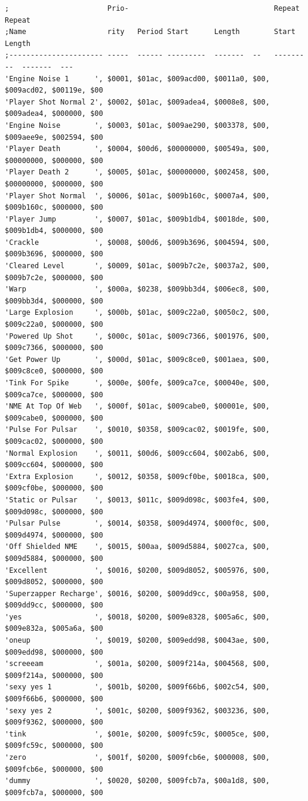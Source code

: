 \begin{lstlisting}[basicstyle=\scriptsize\ttfamily,caption=The contents of \icode{samtab} at \icode{\$9AC800}.]
;                       Prio-                                  Repeat     Repeat
;Name                   rity   Period Start      Length        Start      Length      
;---------------------- -----  ------ ---------  -------  --   ---------  -------  ---
'Engine Noise 1      ', $0001, $01ac, $009acd00, $0011a0, $00, $009acd02, $00119e, $00
'Player Shot Normal 2', $0002, $01ac, $009adea4, $0008e8, $00, $009adea4, $000000, $00
'Engine Noise        ', $0003, $01ac, $009ae290, $003378, $00, $009aee9e, $002594, $00
'Player Death        ', $0004, $00d6, $00000000, $00549a, $00, $00000000, $000000, $00
'Player Death 2      ', $0005, $01ac, $00000000, $002458, $00, $00000000, $000000, $00
'Player Shot Normal  ', $0006, $01ac, $009b160c, $0007a4, $00, $009b160c, $000000, $00
'Player Jump         ', $0007, $01ac, $009b1db4, $0018de, $00, $009b1db4, $000000, $00
'Crackle             ', $0008, $00d6, $009b3696, $004594, $00, $009b3696, $000000, $00
'Cleared Level       ', $0009, $01ac, $009b7c2e, $0037a2, $00, $009b7c2e, $000000, $00
'Warp                ', $000a, $0238, $009bb3d4, $006ec8, $00, $009bb3d4, $000000, $00
'Large Explosion     ', $000b, $01ac, $009c22a0, $0050c2, $00, $009c22a0, $000000, $00
'Powered Up Shot     ', $000c, $01ac, $009c7366, $001976, $00, $009c7366, $000000, $00
'Get Power Up        ', $000d, $01ac, $009c8ce0, $001aea, $00, $009c8ce0, $000000, $00
'Tink For Spike      ', $000e, $00fe, $009ca7ce, $00040e, $00, $009ca7ce, $000000, $00
'NME At Top Of Web   ', $000f, $01ac, $009cabe0, $00001e, $00, $009cabe0, $000000, $00
'Pulse For Pulsar    ', $0010, $0358, $009cac02, $0019fe, $00, $009cac02, $000000, $00
'Normal Explosion    ', $0011, $00d6, $009cc604, $002ab6, $00, $009cc604, $000000, $00
'Extra Explosion     ', $0012, $0358, $009cf0be, $0018ca, $00, $009cf0be, $000000, $00
'Static or Pulsar    ', $0013, $011c, $009d098c, $003fe4, $00, $009d098c, $000000, $00
'Pulsar Pulse        ', $0014, $0358, $009d4974, $000f0c, $00, $009d4974, $000000, $00
'Off Shielded NME    ', $0015, $00aa, $009d5884, $0027ca, $00, $009d5884, $000000, $00
'Excellent           ', $0016, $0200, $009d8052, $005976, $00, $009d8052, $000000, $00
'Superzapper Recharge', $0016, $0200, $009dd9cc, $00a958, $00, $009dd9cc, $000000, $00
'yes                 ', $0018, $0200, $009e8328, $005a6c, $00, $009e832a, $005a6a, $00
'oneup               ', $0019, $0200, $009edd98, $0043ae, $00, $009edd98, $000000, $00
'screeeam            ', $001a, $0200, $009f214a, $004568, $00, $009f214a, $000000, $00
'sexy yes 1          ', $001b, $0200, $009f66b6, $002c54, $00, $009f66b6, $000000, $00
'sexy yes 2          ', $001c, $0200, $009f9362, $003236, $00, $009f9362, $000000, $00
'tink                ', $001e, $0200, $009fc59c, $0005ce, $00, $009fc59c, $000000, $00
'zero                ', $001f, $0200, $009fcb6e, $000008, $00, $009fcb6e, $000000, $00
'dummy               ', $0020, $0200, $009fcb7a, $00a1d8, $00, $009fcb7a, $000000, $00
\end{lstlisting}


